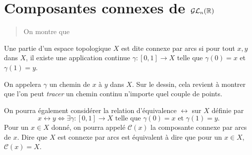 \documentclass[../main.tex]{subfiles}
\begin{document}
\section{Composantes connexes de \(\mathcal{GL}_n(\mathbb{R})\)}
\begin{abstract}
    On montre que 
\end{abstract}
\begin{definition}
    Une partie d'un espace topologique \(X\) est dite connexe par arcs si pour tout \(x,y\) dans \(X\), il existe
    une application continue \(\gamma:[0,1]\to X\) telle que \(\gamma(0)=x\) et \(\gamma(1)=y\).
    \begin{remark} On appelera \(\gamma\) un chemin de \(x\) à \(y\) dans \(X\). Sur le dessin, cela revient 
        à montrer que l'on peut \textit{tracer} un chemin continu n'importe quel couple de points.
    \end{remark}
\end{definition}
On pourra également considérer la relation d'équivalence \(\longleftrightarrow\) sur \(X\) définie par
\begin{equation}
    x\longleftrightarrow y \iff \exists \gamma:[0,1]\to X \text{ telle que } \gamma(0) = x \text{ et } \gamma(1) = y.
\end{equation}
Pour un \(x\in X\) donné, on pourra appelé \(\mathcal{C}(x)\) la composante connexe par arcs de \(x\).
Dire que \(X\) est connexe par arcs est équivalent à dire que pour un \(x\in X\), \(\mathcal{C}(x) = X\).\\
\end{document}

